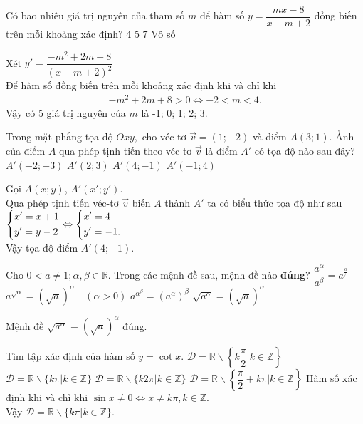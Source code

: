 \begin{ex}%
Có bao nhiêu giá trị nguyên của tham số $ m $	để hàm số $ y = \dfrac{mx - 8}{x - m + 2} $ đồng biến trên mỗi khoảng xác định?
	\choice
	{$ 4 $}
	{\True $ 5 $}
	{$ 7 $}
	{Vô số}
	\loigiai
	{Xét $ y' = \dfrac{-m^2 + 2m + 8}{\left(x - m + 2\right)^2} $\\
		Để hàm số đồng biến trên mỗi khoảng xác định khi và chỉ khi 
		\begin{eqnarray*}
-m^2 + 2m + 8 > 0 \Leftrightarrow -2 < m < 4.
		\end{eqnarray*}
	Vậy có 5 giá trị nguyên của $ m $ là -1; 0; 1; 2; 3. 
		
	}
\end{ex}
\begin{ex}%
Trong mặt phẳng tọa độ $ Oxy, $	 cho véc-tơ $ \vec{v} = (1;-2) $ và điểm $ A(3;1) $. Ảnh của điểm $ A $ qua phép tịnh tiến theo véc-tơ $ \vec{v} $ là điểm $ A' $ có tọa độ nào sau đây?
	\choice
	{$ A'(-2;-3) $}
	{$ A'(2;3) $}
	{\True $ A'(4;-1) $}
	{$ A'(-1;4) $}
	\loigiai
	{Gọi $ A(x;y) $, $ A'(x';y') $.\\ Qua phép tịnh tiến véc-tơ $ \vec{v} $ biến $ A $ thành $ A' $ ta có biểu thức tọa độ như sau\\
		$ \left\{\begin{aligned}&x' = x + 1 \\&y' = y - 2\end{aligned}\right. \Leftrightarrow \left\{\begin{aligned}&x' = 4\\&y' = -1.\end{aligned}\right. $\\
		Vậy tọa độ điểm $ A'(4;-1). $
		
	}
\end{ex}
\begin{ex}%
	Cho $ 0 < a \neq 1; \alpha, \beta \in \mathbb R $. Trong các mệnh đề sau, mệnh đề nào \textbf{đúng}?
	\choice
	{$ \dfrac{a^ \alpha}{a^ \beta} = a^{\tfrac{\alpha}{\beta}} $}
	{$ a^ {\sqrt{\alpha} }= \left(\sqrt{a}\right)^\alpha \quad (\alpha > 0)$}
	{$ a^{\alpha^\beta} = \left(a^\alpha\right)^\beta $}
	{\True $ \sqrt{a^\alpha} = \left(\sqrt{a}\right)^\alpha $}
	\loigiai
	{Mệnh đề $ \sqrt{a^\alpha} = \left(\sqrt{a}\right)^\alpha $ đúng.
		
	}
\end{ex}
\begin{ex}%
	Tìm tập xác định của hàm số $ y = \cot x $.
	\choice
	{$ \mathscr D = \mathbb{R} \backslash \left\lbrace k\dfrac{\pi}{2} | k \in \mathbb{Z} \right\rbrace $}
	{\True $ \mathscr D = \mathbb{R} \backslash \{k\pi | k \in \mathbb{Z} \} $}
	{$ \mathscr D = \mathbb{R} \backslash \{k2\pi | k \in \mathbb{Z} \} $}
	{$ \mathscr D = \mathbb{R} \backslash \left\lbrace\dfrac{\pi}{2} + k \pi  | k \in \mathbb{Z} \right\rbrace $}
	\loigiai
	{
		Hàm số xác định khi và chỉ khi $\sin x \ne 0 \Leftrightarrow x \ne k \pi, k \in \mathbb{Z}.$\\
		Vậy $ \mathscr D = \mathbb{R} \backslash \{k\pi | k \in \mathbb{Z} \} $.
	}
\end{ex}
